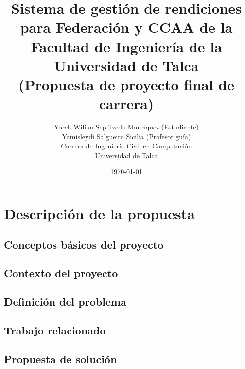 \documentclass[11pt,letterpaper]{article}
\begin{document}
\pagestyle{empty}

\title{
Sistema de gestión de rendiciones para Federación y CCAA de la Facultad de Ingeniería de la Universidad de Talca\\
(Propuesta de proyecto final de carrera)}

\author{
Yorch Wilian Sepúlveda Manríquez (Estudiante)\\
Yamisleydi Salgueiro Sicilia (Profesor guía)\\
Carrera de Ingeniería Civil en Computación\\ 
Universidad de Talca}

\date{\today}

\maketitle


\section{Descripción de la propuesta}

\subsection{Conceptos básicos del proyecto} 


\subsection{Contexto del proyecto} 


\subsection{Definición del problema} 


\subsection{Trabajo relacionado} 


\subsection{Propuesta de solución}

\end{document}
